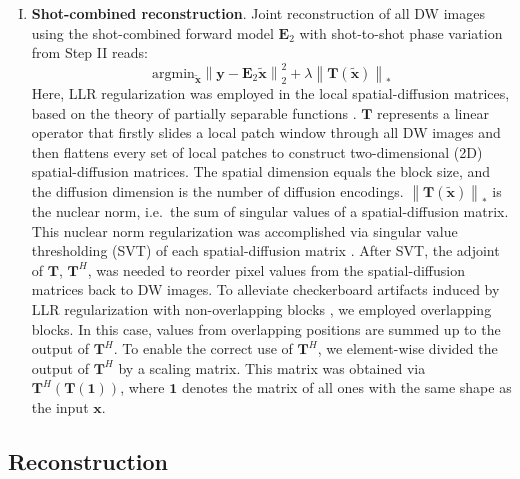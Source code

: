 \documentclass[preprint,12pt,authoryear,review]{elsarticle}
\begin{document}
\begin{enumerate}[I.]
        \item \textbf{Shot-combined reconstruction}.
        Joint reconstruction of all DW images using
        the shot-combined forward model $\mathbf{E}_2$
        with shot-to-shot phase variation from Step II reads:
        \begin{equation}
            \mathrm{argmin}_\mathbf{\tilde{x}} \left\| \mathbf{y} - \mathbf{E}_2 \mathbf{\tilde{x}} \right\|_2^2
            + \lambda \left\| \mathbf{T} ( \mathbf{\tilde{x}} ) \right\|_*
            \label{EQU:solve_dwi}
        \end{equation}
    	Here, LLR regularization was employed in the local spatial-diffusion matrices,
    	based on the theory of partially separable functions
    	\citep{liang_2007_psf,trzasko_2011_lr,zhang_2015_llr}.
    	$\mathbf{T}$ represents a linear operator that
        firstly slides a local patch window
    	through all DW images and then
    	flattens every set of local patches
    	to construct two-dimensional (2D) spatial-diffusion matrices.
        The spatial dimension equals the block size,
        and the diffusion dimension is the number of diffusion encodings.
        $\left\| \mathbf{T} ( \mathbf{\tilde{x}} ) \right\|_*$
        is the nuclear norm, i.e.~the sum of singular values
        of a spatial-diffusion matrix.
    	This nuclear norm regularization was accomplished via
    	singular value thresholding (SVT) of each spatial-diffusion matrix
        \citep{cai_2010_svt}.
        After SVT, the adjoint of $\mathbf{T}$, $\mathbf{T}^H$,
        was needed to reorder
        pixel values from the spatial-diffusion matrices
        back to DW images.
        To alleviate checkerboard artifacts induced
        by LLR regularization with non-overlapping blocks
        \citep{hu_2020_spa_llr},
        we employed overlapping blocks.
        In this case, values from overlapping positions are summed up
        to the output of $\mathbf{T}^H$.
        To enable the correct use of $\mathbf{T}^H$,
        we element-wise divided the output of $\mathbf{T}^H$
        by a scaling matrix. This matrix was obtained via
        $\mathbf{T}^H (\mathbf{T}(\mathbf{1}))$,
        where $\mathbf{1}$ denotes the matrix of all ones
    	with the same shape as the input $\mathbf{x}$.

    \end{enumerate}

    \subsection{Reconstruction}
\end{document}
